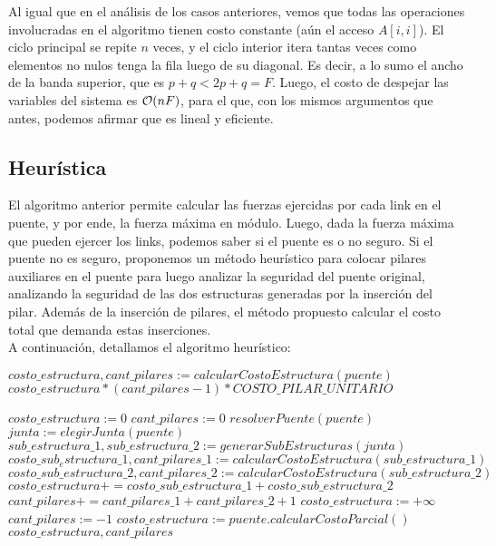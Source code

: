  Al igual que en el análisis de los casos anteriores, vemos que todas las operaciones involucradas en el algoritmo tienen costo constante (aún el acceso $A[i,i]$). El ciclo principal se repite $n$ veces, y el ciclo interior itera tantas veces como elementos no nulos tenga la fila luego de su diagonal. Es decir, a lo sumo el ancho de la banda superior, que es $p+q < 2p+q = F$. Luego, el costo de despejar las variables del sistema es $\mathcal{O}(nF)$, para el que, con los mismos argumentos que antes, podemos afirmar que es lineal y eficiente.
 
\subsection{Heurística}
  El algoritmo anterior permite calcular las fuerzas ejercidas por cada link en el puente, y por ende, la fuerza máxima en módulo. Luego, dada la fuerza máxima que pueden ejercer los links, podemos saber si el puente es o no seguro. Si el puente no es seguro, proponemos un método heurístico para colocar pilares auxiliares en el puente para luego analizar la seguridad del puente original, analizando la seguridad de las dos estructuras generadas por la inserción del pilar. Además de la inserción de pilares, el método propuesto calcular el costo total que demanda estas inserciones. \\
  
  A continuación, detallamos el algoritmo heurístico:
  
\begin{algorithm}[H]
\caption{$calcuarCostoTotal(puente)$}
\begin{algorithmic}
\State $costo\_estructura, cant\_pilares := calcularCostoEstructura(puente)$ \\
\Return $costo\_estructura * (cant\_pilares-1) * COSTO\_PILAR\_UNITARIO$
\end{algorithmic}
\end{algorithm}

\begin{algorithm}[H]
 \caption{$calcularCostoEstructura(puente)$}
 \begin{algorithmic}
  \State $costo\_estructura := 0$
  \State $cant\_pilares := 0$
  \State $resolverPuente(puente)$
  	 
   			 \State $junta := elegirJunta(puente)$
    		\State $sub\_estructura\_1, sub\_estructura\_2 := generarSubEstructuras(junta)$
    		\State $costo\_sub_estructura\_1, cant\_pilares\_1 := calcularCostoEstructura(sub\_estructura\_1)$
    		\State $costo\_sub\_estructura\_2, cant\_pilares\_2 := calcularCostoEstructura(sub\_estructura\_2)$
    		\State $costo\_estructura += costo\_sub\_estructura\_1+costo\_sub\_estructura\_2$
    		\State $cant\_pilares += cant\_pilares\_1 + cant\_pilares\_2 + 1$
    \Else 
    		\State $costo\_estructura := +\infty$ 
    		\State $cant\_pilares := -1$ 
    \EndIf
  \Else
    \State $costo\_estructura := puente.calcularCostoParcial()$
  \EndIf \\
  \Return $costo\_estructura, cant\_pilares$    
 \end{algorithmic}
\end{algorithm}

